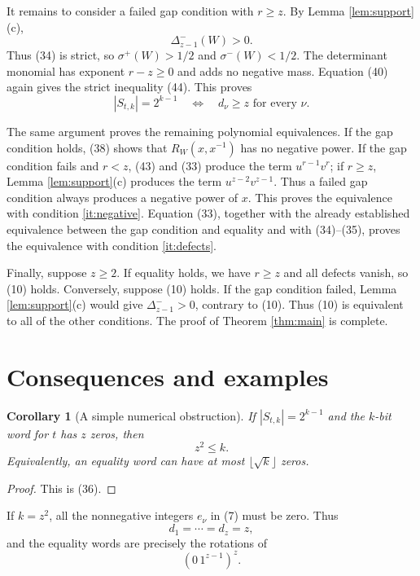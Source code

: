 \documentclass[11pt]{article}
\newtheorem{corollary}[theorem]{Corollary}
\begin{document}
It remains to consider a failed gap condition with $r\geq z$.  By
Lemma \ref{lem:support}(c),
\[
                         \Delta_{z-1}^-(W)>0.
\]
Thus (34) is strict, so $\sigma^+(W)>1/2$ and
$\sigma^-(W)<1/2$.  The determinant monomial has exponent
$r-z\geq0$ and adds no negative mass.  Equation (40) again gives the
strict inequality (44).  This proves
\[
 |S_{t,k}|=2^{k-1}
 \quad\Longleftrightarrow\quad
 d_\nu\geq z\text{ for every }\nu.                          \tag{45}
\]

The same argument proves the remaining polynomial equivalences.  If
the gap condition holds, (38) shows that $R_W(x,x^{-1})$ has no
negative power.  If the gap condition fails and $r<z$, (43) and (33)
produce the term $u^{r-1}v^r$; if $r\geq z$, Lemma
\ref{lem:support}(c) produces the term $u^{z-2}v^{z-1}$.
Thus a failed gap condition always produces a negative power of $x$.
This proves the equivalence with condition \ref{it:negative}.
Equation (33), together with the already established equivalence between
the gap condition and equality and with (34)--(35), proves the equivalence
with condition \ref{it:defects}.

Finally, suppose $z\geq2$.  If equality holds, we have $r\geq z$ and
all defects vanish, so (10) holds.  Conversely, suppose (10) holds.
If the gap condition failed, Lemma \ref{lem:support}(c) would give
$\Delta_{z-1}^->0$, contrary to (10).  Thus (10) is equivalent to all
of the other conditions.  The proof of Theorem \ref{thm:main} is
complete.

\section{Consequences and examples}

\begin{corollary}[A simple numerical obstruction]\label{cor:numerical}
If $|S_{t,k}|=2^{k-1}$ and the $k$-bit word for $t$ has $z$ zeros,
then
\[
                              z^2\leq k.                     \tag{46}
\]
Equivalently, an equality word can have at most $\lfloor\sqrt{k}\rfloor$
zeros.
\end{corollary}

\begin{proof}
This is (36).
\end{proof}

If $k=z^2$, all the nonnegative integers $e_\nu$ in (7) must be zero.
Thus
\[
                          d_1=\cdots=d_z=z,                  \tag{47}
\]
and the equality words are precisely the rotations of
\[
                          (0\,1^{z-1})^z.                    \tag{48}
\]
\end{document}
